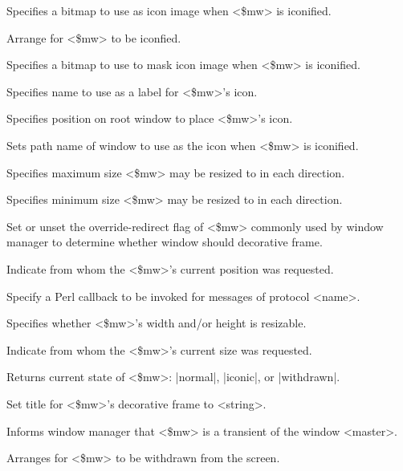 \begin{enum}{1cm}
Specifies a bitmap to use as icon image when <\$mw> is iconified.

Arrange for <\$mw> to be iconfied.

Specifies a bitmap to use to mask icon image when <\$mw> is iconified.

Specifies name to use as a label for <\$mw>'s icon.

Specifies position on root window to place <\$mw>'s icon.

Sets path name of window to use as the icon when <\$mw> is iconified.

Specifies maximum size <\$mw> may be resized to in each direction.

Specifies minimum size <\$mw> may be resized to in each direction.

Set or unset the override-redirect flag of <\$mw> commonly used by
window manager to determine whether window should decorative frame.

Indicate from whom the <\$mw>'s current position was requested.

Specify a Perl callback to be invoked for messages of protocol <name>.

Specifies whether <\$mw>'s width and/or height is resizable.

Indicate from whom the <\$mw>'s current size was requested.

Returns current state of <\$mw>: |normal|, |iconic|, or |withdrawn|.

Set title for <\$mw>'s decorative frame to <string>.

Informs window manager that <\$mw> is a transient of the window <master>.

Arranges for <\$mw> to be withdrawn from the screen.

\end{enum}

